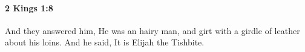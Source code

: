 
		\paragraph{2 Kings 1:8} %
			\label{2KINGS-1-8}

			And they answered him, He was an hairy man, and girt with a girdle of leather about his loins. And he said, It is Elijah the Tishbite.


